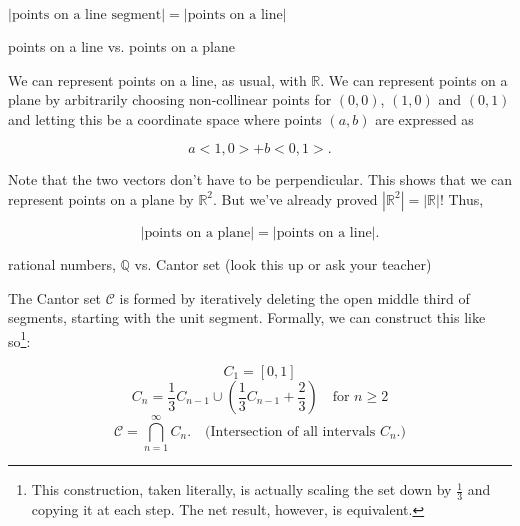 \documentclass[../key.tex]{subfiles}
\begin{document}
$|\text{points on a line segment}| = |\text{points on a line}|$

\begin{inner_problem}
\item points on a line vs. points on a plane
\end{inner_problem}

\noindent We can represent points on a line, as usual, with $\mathbb{R}$. We can represent points on a plane by arbitrarily choosing non-collinear points for $(0,0)$, $(1,0)$ and $(0,1)$ and letting this be a coordinate space where points $(a,b)$ are expressed as

$$a<1,0>+b<0,1>.$$

\noindent Note that the two vectors don't have to be perpendicular. This shows that we can represent points on a plane by $\mathbb{R}^2$. But we've already proved $\left|\mathbb{R}^2\right| = |\mathbb{R}|$! Thus,

$$\left|\text{points on a plane}\right| = |\text{points on a line}|.$$

\begin{inner_problem}
\item rational numbers, $\mathbb{Q}$ vs. Cantor set (look this up or ask your teacher)
\end{inner_problem}

\noindent The Cantor set $\mathcal{C}$ is formed by iteratively deleting the open middle third of segments, starting with the unit segment. Formally, we can construct this like so\footnote{This construction, taken literally, is actually scaling the set down by $\frac{1}{3}$ and copying it at each step. The net result, however, is equivalent.}:

$$C_1=[0,1]$$
$$C_n=\frac{1}{3} C_{n-1} \cup \left(\frac{1}{3} C_{n-1} + \frac{2}{3}\right) \quad \text{for }n\geq 2$$
$$\mathcal{C}=\bigcap_{n=1}^{\infty} C_n. \quad \text{(Intersection of all intervals }C_n\text{.)}$$
\end{document}
